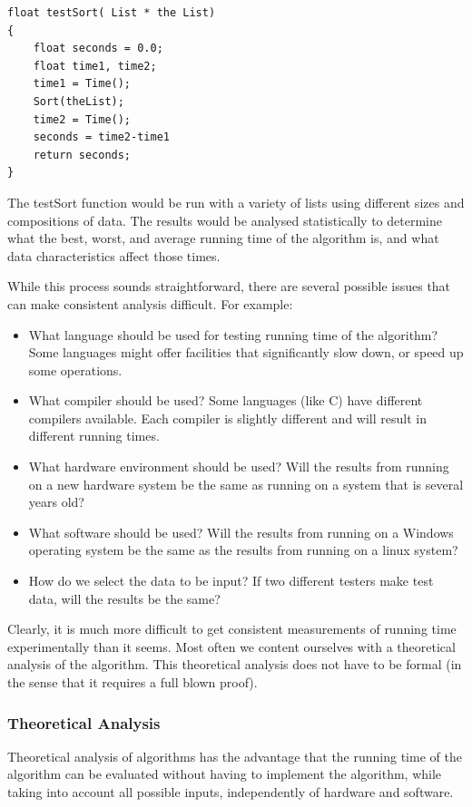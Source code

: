 \begin{lstlisting}
float testSort( List * the List)
{
    float seconds = 0.0;
    float time1, time2;
    time1 = Time();
    Sort(theList);
    time2 = Time();
    seconds = time2-time1
    return seconds;
}
\end{lstlisting}

The testSort function would be run with a variety of lists using different sizes and compositions of data.   The results would be analysed statistically to determine what the best, worst, and average running time of the algorithm is, and what data characteristics affect those times.

While this process sounds straightforward,  there are several  possible issues that can make consistent analysis difficult.  For example:

\begin{itemize}
\item What language should be used for testing running time of the algorithm?   Some languages might offer facilities that significantly slow down, or speed up some operations.
\item What compiler should be used?  Some languages (like C) have different compilers available.   Each compiler is slightly different and will result in different running times.
\item What hardware environment should be used?  Will the results from running on a new  hardware system be the same as running on a system that is several years old?
\item What software should be used?  Will the results from running on a Windows operating system be the same as the results from running on a linux system?   
\item How do we select the data to be input?   If two different testers make test data, will the results be the same?

\end{itemize}

Clearly, it is much more difficult to get consistent measurements of running time experimentally than it seems.    Most often we content ourselves with a theoretical analysis of the algorithm.  This theoretical analysis does not have to be formal (in the sense that it requires a full blown proof).  


\subsubsection{Theoretical Analysis}
Theoretical analysis of algorithms has the advantage that the running time of the algorithm can be evaluated without having to implement the algorithm,  while taking into account all possible inputs, independently of hardware and software.

